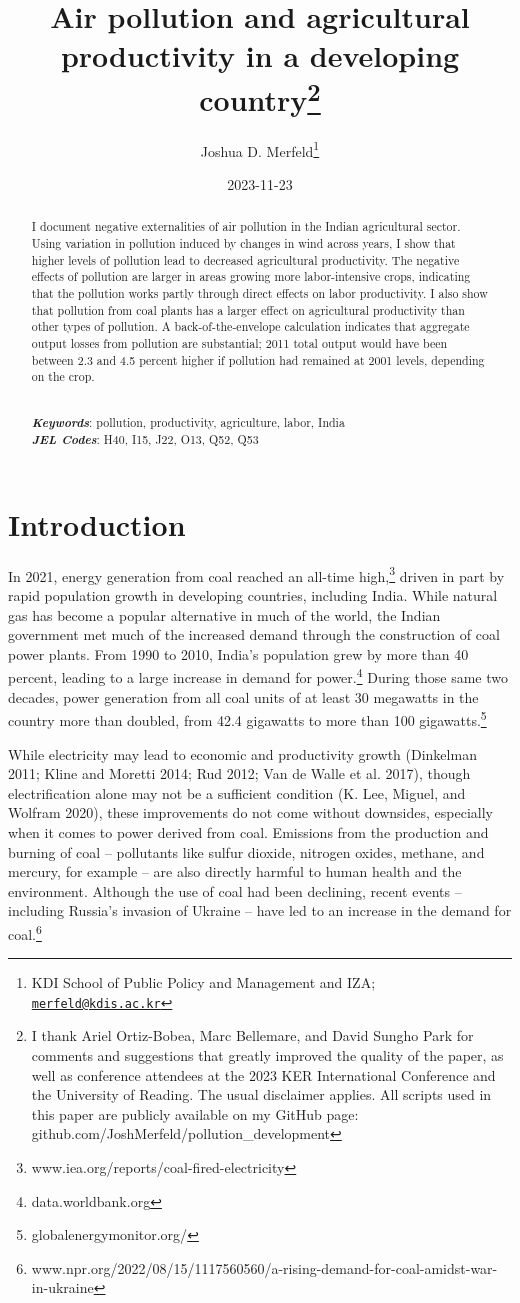 \documentclass[
]{article}
\title{Air pollution and agricultural productivity in a developing country\footnote{I thank Ariel Ortiz-Bobea, Marc Bellemare, and David Sungho Park for comments and suggestions that greatly improved the quality of the paper, as well as conference attendees at the 2023 KER International Conference and the University of Reading. The usual disclaimer applies. All scripts used in this paper are publicly available on my GitHub page: github.com/JoshMerfeld/pollution\_development}}
\author{Joshua D. Merfeld\footnote{KDI School of Public Policy and Management and IZA; \href{mailto:merfeld@kdis.ac.kr}{\nolinkurl{merfeld@kdis.ac.kr}}}}
\date{2023-11-23}
\begin{document}
\maketitle
\begin{abstract}
\noindent I document negative externalities of air pollution in the Indian agricultural sector. Using variation in pollution induced by changes in wind across years, I show that higher levels of pollution lead to decreased agricultural productivity. The negative effects of pollution are larger in areas growing more labor-intensive crops, indicating that the pollution works partly through direct effects on labor productivity. I also show that pollution from coal plants has a larger effect on agricultural productivity than other types of pollution. A back-of-the-envelope calculation indicates that aggregate output losses from pollution are substantial; 2011 total output would have been between 2.3 and 4.5 percent higher if pollution had remained at 2001 levels, depending on the crop.\\
\strut \\
\textbf{\textit{Keywords}}: pollution, productivity, agriculture, labor, India\\
\textbf{\textit{JEL Codes}}: H40, I15, J22, O13, Q52, Q53
\end{abstract}

\newpage
\doublespacing

\hypertarget{introduction}{%
\section{Introduction}\label{introduction}}

In 2021, energy generation from coal reached an all-time high,\footnote{www.iea.org/reports/coal-fired-electricity} driven in part by rapid population growth in developing countries, including India. While natural gas has become a popular alternative in much of the world, the Indian government met much of the increased demand through the construction of coal power plants. From 1990 to 2010, India's population grew by more than 40 percent, leading to a large increase in demand for power.\footnote{data.worldbank.org} During those same two decades, power generation from all coal units of at least 30 megawatts in the country more than doubled, from 42.4 gigawatts to more than 100 gigawatts.\footnote{globalenergymonitor.org/}

While electricity may lead to economic and productivity growth (Dinkelman 2011; Kline and Moretti 2014; Rud 2012; Van de Walle et al. 2017), though electrification alone may not be a sufficient condition (K. Lee, Miguel, and Wolfram 2020), these improvements do not come without downsides, especially when it comes to power derived from coal. Emissions from the production and burning of coal -- pollutants like sulfur dioxide, nitrogen oxides, methane, and mercury, for example -- are also directly harmful to human health and the environment. Although the use of coal had been declining, recent events -- including Russia's invasion of Ukraine -- have led to an increase in the demand for coal.\footnote{www.npr.org/2022/08/15/1117560560/a-rising-demand-for-coal-amidst-war-in-ukraine}
\end{document}
